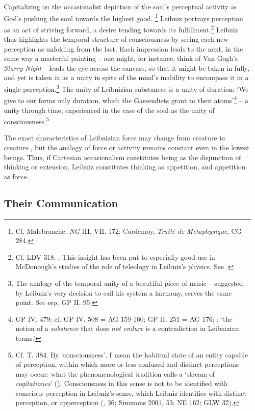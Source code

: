 \documentclass{article}
\begin{document}
Capitalizing on the occasionalist depiction of the soul's perceptual
activity as God's pushing the soul towards the highest good, \footnote{Cf.
  Malebranche, \emph{NG} III. VII, 172; Cordemoy, \emph{Traité de
  Metaphysique}, CG 284.} Leibniz portrays perception as an act of
striving forward, a desire tending towards its fulfillment.\footnote{Cf.
  LDV 318. \autocite{Jorgensen2015}; This insight has been put to especially good
  use in McDonough's studies of the role of teleology in Leibniz's
  physics. See \autocite{McDonough2009,McDonough2016}.} Leibniz thus highlights the
temporal structure of consciousness by seeing each new perception as
unfolding from the last. Each impression leads to the next, in the same
way a masterful painting -- one might, for instance, think of Van Gogh's
\emph{Starry Night} -- leads the eye across the canvass, so that it
might be taken in fully, and yet is taken in as a unity in spite of the
mind's inability to encompass it in a single perception.\footnote{The
  analogy of the temporal unity of a beautiful piece of music --
  suggested by Leibniz's very decision to call his system a harmony,
  serves the same point. See esp. GP II. 95.} The unity of Leibnizian
substances is a unity of duration: `We give to our forms only duration,
which the Gassendists grant to their atoms'\footnote{GP IV. 479; cf. GP
  IV. 508 = AG 159-160; GP II. 251 = AG 176; \autocite[870]{Whipple2010}: `the
  notion of a \emph{substance} that does \emph{not endure} is a
  contradiction in Leibnizian terms.'} -- a unity through time,
experienced in the case of the soul as the unity of
consciousness.\footnote{Cf. T. 384. By `consciousness', I mean the
  habitual state of an entity capable of perception, within which more
  or less confused and distinct perceptions may occur: what the
  phenomenological tradition calls a `stream of \emph{cogitationes}'
  (\autocite[31-33]{Husserl1960}). Consciousness in this sense is not to be
  identified with conscious perception in Leibniz's sense, which Leibniz
  identifies with distinct perception, or apperception (\autocite[36]{McRae1976}, 36;
  Simmons 2001, 53; NE 162; GLW 32).}

The exact characteristics of Leibnizian force may change from creature
to creature , but the analogy of force or activity remains constant even
in the lowest beings. Thus, if Cartesian occasionalism constitutes being
as the disjunction of thinking or extension, Leibniz constitutes
thinking as appetition, and appetition as force.

\subsection{Their Communication}
\end{document}
